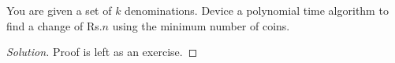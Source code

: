 \begin{solution}{4.2}
    \begin{question}
        You are given a set of $k$ denominations. Device a polynomial time algorithm to find a change of Rs.$n$ using the minimum number of
coins.    
    \end{question}
    \tcblower{}
    \begin{proof}[Solution]
        Proof is left as an exercise.
    \end{proof}
\end{solution}
